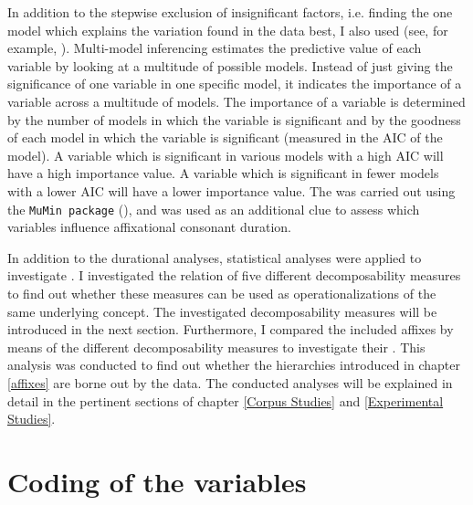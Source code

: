 In addition to the stepwise exclusion of insignificant factors, i.e. finding the one model which explains the variation found in the data best, I also used  (see, for example, \citealt{Barth.2014}). Multi-model inferencing estimates the predictive value of each variable by looking at a multitude of possible models. Instead of just giving the significance of one variable in one specific model, it indicates the importance of a variable across a multitude of models. 
The importance of a variable is determined by the number of models in which the variable is significant and by the goodness of each model in which the variable is significant (measured in the AIC of the model). A variable which is significant in various models with a high AIC will have a high importance value. A variable which is significant in fewer models with a lower AIC will have a lower importance value. The  was carried out using the \texttt{MuMin package} (\citealt{Barton.2016}), and was used as an additional clue to assess which variables influence affixational consonant duration.

In addition to the durational analyses, statistical analyses were applied to investigate . 
I investigated the relation of five different decomposability measures to find out whether these measures can be used as operationalizations of the same underlying concept. The investigated decomposability measures will be introduced in the next section. 
Furthermore, I compared the included affixes by means of the different decomposability measures to investigate their . This analysis was conducted to find out whether the  hierarchies introduced in chapter \ref{affixes} are borne out by the data. 
The conducted  analyses will be explained in detail in the pertinent sections of chapter \ref{Corpus Studies} and \ref{Experimental Studies}. 



\section{Coding of the variables} \label{General method annotation}



